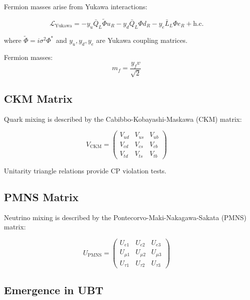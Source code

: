 Fermion masses arise from Yukawa interactions:

\begin{equation}
\mathcal{L}_{\text{Yukawa}} = -y_u \bar{Q}_L \tilde{\Phi} u_R - y_d \bar{Q}_L \Phi d_R - y_e \bar{L}_L \Phi e_R + \text{h.c.}
\end{equation}

where $\tilde{\Phi} = i\sigma^2\Phi^*$ and $y_u, y_d, y_e$ are Yukawa coupling matrices.

Fermion masses:
\begin{equation}
m_f = \frac{y_f v}{\sqrt{2}}
\end{equation}

\subsection{CKM Matrix}

Quark mixing is described by the Cabibbo-Kobayashi-Maskawa (CKM) matrix:

\begin{equation}
V_{\text{CKM}} = \begin{pmatrix}
V_{ud} & V_{us} & V_{ub} \\
V_{cd} & V_{cs} & V_{cb} \\
V_{td} & V_{ts} & V_{tb}
\end{pmatrix}
\end{equation}

Unitarity triangle relations provide CP violation tests.

\subsection{PMNS Matrix}

Neutrino mixing is described by the Pontecorvo-Maki-Nakagawa-Sakata (PMNS) matrix:

\begin{equation}
U_{\text{PMNS}} = \begin{pmatrix}
U_{e1} & U_{e2} & U_{e3} \\
U_{\mu 1} & U_{\mu 2} & U_{\mu 3} \\
U_{\tau 1} & U_{\tau 2} & U_{\tau 3}
\end{pmatrix}
\end{equation}

\subsection{Emergence in UBT}

